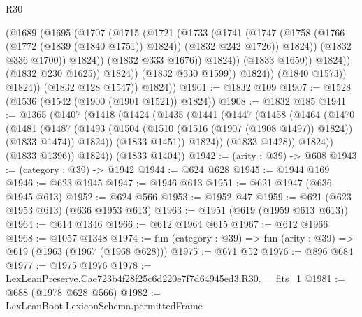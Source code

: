 \begin{lexlean}{R30}
\begin{coremodule}
                                  (@1689
                                    (@1695
                                      (@1707
                                        (@1715
                                          (@1721
                                            (@1733
                                              (@1741
                                                (@1747
                                                  (@1758
                                                    (@1766 (@1772 (@1839 (@1840 @1751)) @1824))
                                                    (@1832 @242 @1726))
                                                  @1824))
                                              (@1832 @336 @1700))
                                            @1824))
                                        (@1832 @333 @1676))
                                      @1824))
                                  (@1833 @1650))
                                @1824))
                            (@1832 @230 @1625))
                          @1824))
                      (@1832 @330 @1599))
                    @1824))
                (@1840 @1573))
              @1824))
          (@1832 @128 @1547))
        @1824))
@1901 := @1832 @109
@1907 := @1528 (@1536 (@1542 (@1900 (@1901 @1521)) @1824))
@1908 := @1832 @185
@1941 := @1365
    (@1407
      (@1418
        (@1424
          (@1435
            (@1441
              (@1447
                (@1458
                  (@1464
                    (@1470
                      (@1481
                        (@1487
                          (@1493
                            (@1504 (@1510 (@1516 (@1907 (@1908 @1497)) @1824)) (@1833 @1474))
                            @1824))
                        (@1833 @1451))
                      @1824))
                  (@1833 @1428))
                @1824))
            (@1833 @1396))
          @1824))
      (@1833 @1404))
@1942 := (arity : @39) -> @608
@1943 := (category : @39) -> @1942
@1944 := @624 @628
@1945 := @1944 @169
@1946 := @623 @1945
@1947 := @1946 @613
@1951 := @621 @1947 (@636 @1945 @613)
@1952 := @624 @566
@1953 := @1952 @47
@1959 := @621 (@623 @1953 @613) (@636 @1953 @613)
@1963 := @1951 (@619 (@1959 @613 @613))
@1964 := @614 @1346
@1966 := @612 @1964 @615
@1967 := @612 @1966
@1968 := @1057 @1348
@1974 := fun (category : @39) => fun (arity : @39) => @619 (@1963 (@1967 (@1968 @628)))
@1975 := @671 @52
@1976 := @896 @684
@1977 := @1975 @1976
@1978 := LexLeanPreserve.Cae723b4f28f25c6d220e7f7d64945ed3.R30.__fits_1
@1981 := @688 (@1978 @628 @566)
@1982 := LexLeanBoot.LexiconSchema.permittedFrame

\end{coremodule}
\end{lexlean}
